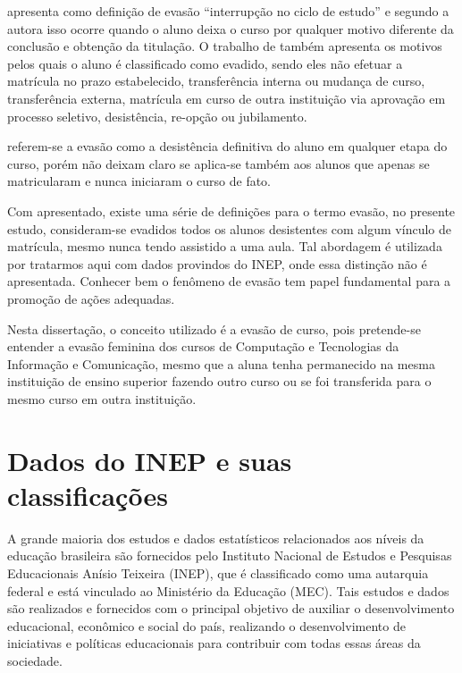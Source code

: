  apresenta como definição de evasão “interrupção no ciclo de estudo” e segundo a autora isso ocorre quando o aluno deixa o curso por qualquer motivo diferente da conclusão e obtenção da titulação. O trabalho de  também apresenta os motivos pelos quais o aluno é classificado como evadido, sendo eles não efetuar a matrícula no prazo estabelecido, transferência interna ou mudança de curso, transferência externa, matrícula em curso de outra instituição via aprovação em processo seletivo, desistência, re-opção ou jubilamento.

 referem-se a evasão como a desistência definitiva do aluno em qualquer etapa do curso, porém não deixam claro se aplica-se também aos alunos que apenas se matricularam e nunca iniciaram o curso de fato.


Com apresentado, existe uma série de definições para o termo evasão, no presente estudo, consideram-se evadidos todos os alunos desistentes com algum vínculo de matrícula, mesmo nunca tendo assistido a uma aula. Tal abordagem é utilizada por tratarmos aqui com dados provindos do INEP, onde essa distinção não é apresentada. Conhecer bem o fenômeno de evasão tem papel fundamental para a promoção de ações adequadas.

Nesta dissertação, o conceito utilizado é a evasão de curso, pois pretende-se entender a evasão feminina dos cursos de Computação e Tecnologias da Informação e Comunicação, mesmo que a aluna tenha permanecido na mesma instituição de ensino superior fazendo outro curso ou se foi transferida para o mesmo curso em outra instituição.



\section{Dados do INEP e suas classificações} \label{sec:ClassificacaoDados}%

A grande maioria dos estudos e dados estatísticos relacionados aos níveis da educação brasileira são fornecidos pelo Instituto Nacional de Estudos e Pesquisas Educacionais Anísio Teixeira (INEP), que é classificado como uma autarquia federal e está vinculado ao Ministério da Educação (MEC). Tais estudos e dados são realizados e fornecidos com o principal objetivo de auxiliar o desenvolvimento educacional, econômico e social do país, realizando o desenvolvimento de iniciativas e políticas educacionais para contribuir com todas essas áreas da sociedade.

